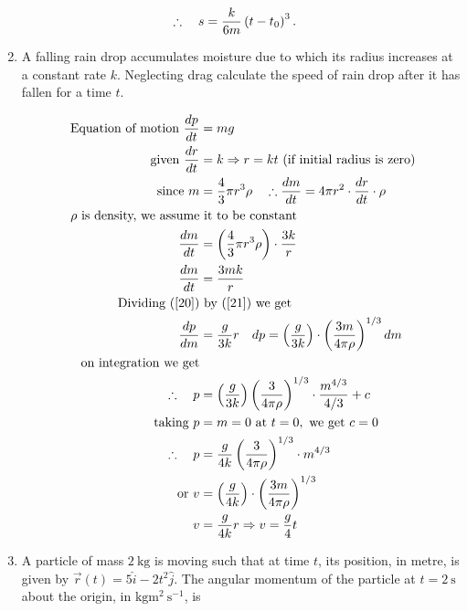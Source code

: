 \begin{enumerate}
\begin{answer}
\begin{align}
	\therefore \quad s&=\frac{k}{6 m}\left(t-t_{0}\right)^{3} .\notag
	\end{align}
\end{answer}
\item A falling rain drop accumulates moisture due to which its radius increases at a constant rate $k$. Neglecting drag calculate the speed of rain drop after it has fallen for a time $t$.
\begin{answer}
	\begin{align}
	\text{Equation of motion }\frac{d p}{d t}&=m g\label{20}\\
	\text{given }\frac{d r}{d t}&=k \Rightarrow r=k t\text{ (if initial radius is zero)}\notag\\
	\text{since }m&=\frac{4}{3} \pi r^{3} \rho \quad \therefore \frac{d m}{d t}=4 \pi r^{2} \cdot \frac{d r}{d t} \cdot \rho\notag\\
\text{	$\rho$ is density, we assume}&\text{ it to be constant}\notag\\
	\frac{d m}{d t} &=\left(\frac{4}{3} \pi r^{3} \rho\right) \cdot \frac{3 k}{r} \notag\\
	\frac{d m}{d t} &=\frac{3 m k}{r}\label{21}\\
\text{	Dividing (\ref{20})}&\text{ by (\ref{21}) we get}\notag\\
\frac{d p}{d m}&=\frac{g}{3 k} r \quad d p=\left(\frac{g}{3 k}\right) \cdot\left(\frac{3 m}{4 \pi \rho}\right)^{1 / 3} d m\notag\\
\text{on integration we get}\notag\\
\therefore \quad p&=\left(\frac{g}{3 k}\right)\left(\frac{3}{4 \pi \rho}\right)^{1 / 3} \cdot \frac{m^{4 / 3}}{4 / 3}+c\notag\\
\text{taking }p&=m=0\text{ at }t=0,\text{ we get }c=0\notag\\
\therefore \quad p&=\frac{g}{4 k}\left(\frac{3}{4 \pi \rho}\right)^{1 / 3} \cdot m^{4 / 3}\notag\\
\text{or }v&=\left(\frac{g}{4 k}\right) \cdot\left(\frac{3 m}{4 \pi \rho}\right)^{1 / 3}\notag\\
v&=\frac{g}{4 k} r \Rightarrow v=\frac{g}{4} t\notag
	\end{align}
\end{answer}
	\item A particle of mass $2 \mathrm{~kg}$ is moving such that at time $t$, its position, in metre, is given by $\vec{r}(t)=5 \hat{i}-2 t^{2} \hat{j}$. The angular momentum of the particle at $t=2 \mathrm{~s}$ about the origin, in $\mathrm{kg} \mathrm{m}^{2} \mathrm{~s}^{-1}$, is

\end{enumerate}
